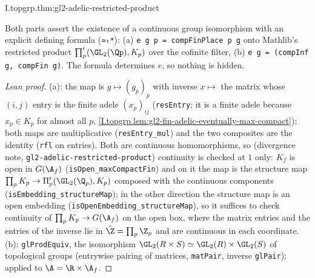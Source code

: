 \begin{theorem}
\end{theorem}
\begin{tfformal}{I.topgrp.thm:gl2-adelic-restricted-product}
\begin{tffidelity}
Both parts assert the existence of a continuous group isomorphism with an explicit defining formula (\texttt{≃ₜ*}): (a) \texttt{e g p = compFinPlace p g} onto Mathlib's restricted product $\prod'_p(\GL_2(\Qp),K_p)$ over the cofinite filter, (b) \texttt{e g = (compInf g, compFin g)}. The formula determines $e$, so nothing is hidden.
\end{tffidelity}
\end{tfformal}
\begin{proof}[Lean proof]
(a): the map is $g\mapsto(g_p)_p$ with inverse $x\mapsto$ the matrix whose $(i,j)$ entry is the finite adele $(x_p)_{ij}$ (\texttt{resEntry}; it is a finite adele because $x_p\in K_p$ for almost all $p$, \cref{I.topgrp.lem:gl2-fin-adelic-eventually-max-compact}); both maps are multiplicative (\texttt{resEntry\_mul}) and the two composites are the identity (\texttt{rfl} on entries). Both are continuous homomorphisms, so (divergence note, \texttt{gl2-adelic-restricted-product}) continuity is checked at $1$ only: $K_f$ is open in $G(\A_f)$ (\texttt{isOpen\_maxCompactFin}) and on it the map is the structure map $\prod_pK_p\to\Pi'_p(\GL_2(\Q_p),K_p)$ composed with the continuous components (\texttt{isEmbedding\_structureMap}); in the other direction the structure map is an open embedding (\texttt{isOpenEmbedding\_structureMap}), so it suffices to check continuity of $\prod_pK_p\to G(\A_f)$ on the open box, where the matrix entries and the entries of the inverse lie in $\hat\Z=\prod_p\Z_p$ and are continuous in each coordinate. (b): \texttt{glProdEquiv}, the isomorphism $\GL_2(R\times S)\simeq\GL_2(R)\times\GL_2(S)$ of topological groups (entrywise pairing of matrices, \texttt{matPair}, inverse \texttt{glPair}); applied to $\A=\R\times\A_f$.
\end{proof}

